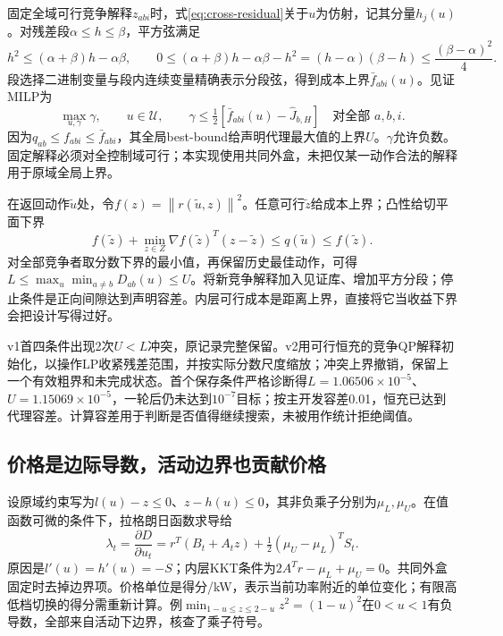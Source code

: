 \documentclass[UTF8,fontset=fandol,11pt,a4paper]{ctexart}
\newcommand{\norm}[1]{\left\lVert#1\right\rVert}
\begin{document}
固定全域可行竞争解释$z_{abi}$时，式\eqref{eq:cross-residual}关于$u$为仿射，记其分量$h_j(u)$。对残差段$\alpha\le h\le\beta$，平方弦满足
\begin{equation}
 h^2\le (\alpha+\beta)h-\alpha\beta,
 \qquad 0\le(\alpha+\beta)h-\alpha\beta-h^2
 =(h-\alpha)(\beta-h)\le\frac{(\beta-\alpha)^2}{4}.
\end{equation}
段选择二进制变量与段内连续变量精确表示分段弦，得到成本上界$\bar f_{abi}(u)$。见证MILP为
\begin{equation}
 \max_{u,\gamma}\gamma,\qquad u\in\mathcal U,\qquad
 \gamma\le\tfrac12[\bar f_{abi}(u)-\hat J_{b,H}]\quad\text{对全部 }a,b,i.
 \label{eq:cross-master}
\end{equation}
因为$q_{ab}\le f_{abi}\le\bar f_{abi}$，其全局best-bound给声明代理最大值的上界$U$。$\gamma$允许负数。固定解释必须对全控制域可行；本实现使用共同外盒，未把仅某一动作合法的解释用于原域全局上界。

在返回动作$\tilde u$处，令$f(z)=\norm{r(\tilde u,z)}^2$。任意可行$\tilde z$给成本上界；凸性给切平面下界
\begin{equation}
 f(\tilde z)+\min_{z\in Z}\nabla f(\tilde z)^T(z-\tilde z)
 \le q(\tilde u)\le f(\tilde z).
\end{equation}
对全部竞争者取分数下界的最小值，再保留历史最佳动作，可得$L\le\max_u\min_{a\ne b}D_{ab}(u)\le U$。将新竞争解释加入见证库、增加平方分段；停止条件是正向间隙达到声明容差。内层可行成本是距离上界，直接将它当收益下界会把设计写得过好。

v1首四条件出现2次$U<L$冲突，原记录完整保留。v2用可行恒充的竞争QP解释初始化，以操作LP收紧残差范围，并按实际分数尺度缩放；冲突上界撤销，保留上一个有效粗界和未完成状态。首个保存条件严格诊断得$L=1.06506\times10^{-5}$、$U=1.15069\times10^{-5}$，一轮后仍未达到$10^{-7}$目标；按主开发容差0.01，恒充已达到代理容差。计算容差用于判断是否值得继续搜索，未被用作统计拒绝阈值。

\subsection{价格是边际导数，活动边界也贡献价格}
设原域约束写为$l(u)-z\le0$、$z-h(u)\le0$，其非负乘子分别为$\mu_L,\mu_U$。在值函数可微的条件下，拉格朗日函数求导给
\begin{equation}
 \boxed{\lambda_t=\frac{\partial D}{\partial u_t}
 =r^T(B_t+A_tz)+\tfrac12(\mu_U-\mu_L)^TS_t.}
 \label{eq:cross-price}
\end{equation}
原因是$l'(u)=h'(u)=-S$；内层KKT条件为$2A^Tr-\mu_L+\mu_U=0$。共同外盒固定时去掉边界项。价格单位是得分/kW，表示当前功率附近的单位变化；有限高低档切换的得分需重新计算。例$\min_{1-u\le z\le2-u}z^2=(1-u)^2$在$0<u<1$有负导数，全部来自活动下边界，核查了乘子符号。
\end{document}
